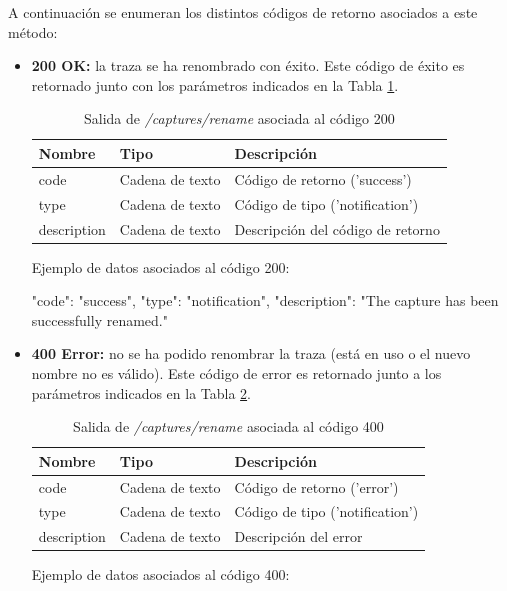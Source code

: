 A continuación se enumeran los distintos códigos de retorno asociados a este método:
\begin{itemize}

\item{\textbf{200 OK:} la \gls{traza} se ha renombrado con éxito. Este código de éxito es retornado junto con los parámetros indicados en la Tabla \ref{extra:api:capturesrename:ok}.
\begin{table}[H]
\centering
\begin{tabular}{|l|l|l|}
\hline
\rowcolor[HTML]{F5F5F5}
\textbf{Nombre}  & \textbf{Tipo}   & \textbf{Descripción}              \\ \hline
code             & Cadena de texto & Código de retorno ('success')     \\ \hline
type             & Cadena de texto & Código de tipo ('notification')   \\ \hline
description      & Cadena de texto & Descripción del código de retorno \\ \hline
\end{tabular}
\caption{Salida de \textit{/captures/rename} asociada al código 200}
\label{extra:api:capturesrename:ok}
\end{table}
\begin{minipage}{\textwidth}
Ejemplo de datos asociados al código 200:

\begin{code}[language=json]
{
  "code": "success",
  "type": "notification",
  "description": "The capture has been successfully renamed."
}
\end{code}
\end{minipage}
}

\item{\textbf{400 Error:} no se ha podido renombrar la \gls{traza} (está en uso o el nuevo nombre no es válido). Este código de error es retornado junto a los parámetros indicados en la Tabla \ref{extra:api:capturesrename:error}.
\begin{table}[H]
\centering
\begin{tabular}{|l|l|l|}
\hline
\rowcolor[HTML]{F5F5F5}
\textbf{Nombre}  & \textbf{Tipo}   & \textbf{Descripción}            \\ \hline
code             & Cadena de texto & Código de retorno ('error')     \\ \hline
type             & Cadena de texto & Código de tipo ('notification') \\ \hline
description      & Cadena de texto & Descripción del error           \\ \hline
\end{tabular}
\caption{Salida de \textit{/captures/rename} asociada al código 400}
\label{extra:api:capturesrename:error}
\end{table}
\begin{minipage}{\textwidth}
Ejemplo de datos asociados al código 400:


\end{minipage}}
\end{itemize}
